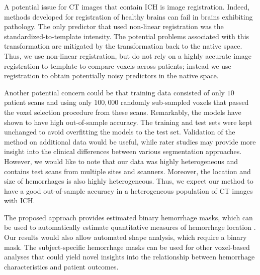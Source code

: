 \documentclass{elsarticle_nonatbib}\usepackage[]{graphicx}\usepackage[]{color}
\begin{document}
A potential issue for CT images that contain ICH is image registration.  Indeed, methods developed for registration of healthy brains can fail in brains exhibiting pathology.  The only predictor that used non-linear registration was the standardized-to-template intensity. The potential problems associated with this transformation are mitigated by the transformation back to the native space.
Thus, we use non-linear registration, but do not rely on a highly accurate image registration to template to compare voxels across patients; instead we use registration to obtain potentially noisy predictors in the native space.

Another potential concern could be that training data consisted of only $10$ patient scans and using only $100{,}000$ randomly sub-sampled voxels that passed the voxel selection procedure from these scans.  Remarkably, the models have shown to have high out-of-sample accuracy.  The training and test sets were kept unchanged to avoid overfitting the models to the test set.
Validation of the method on additional data would be useful, while rater studies may provide more insight into the clinical differences between various segmentation approaches.  However, we would like to note that our data was highly heterogeneous and contains test scans from multiple sites and scanners. Moreover, the location and size of hemorrhages is also highly heterogeneous.  Thus, we expect our method to have a good out-of-sample accuracy in a heterogeneous population of CT images with ICH.

The proposed approach provides estimated binary hemorrhage masks, which can be used to automatically estimate quantitative measures of hemorrhage location \citep{muschelli2015quantitative}.  Our results would also allow automated shape analysis, which require a binary mask.  The subject-specific hemorrhage masks can be used for other voxel-based analyses that could yield novel insights into the relationship between hemorrhage characteristics and patient outcomes.
\end{document}

